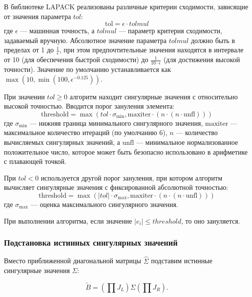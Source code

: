 В библиотеке LAPACK \cite{Anderson1999} реализованы различные критерии сходимости, зависящие от значения параметра \(tol\):
\begin{equation}
\text{tol} = \epsilon \cdot tolmul
\end{equation}
где \(\epsilon\) — машинная точность, а \(tolmul\) — параметр критерия сходимости, задаваемый вручную. Абсолютное значение параметра \(tolmul\) должно быть в пределах от 1 до \(\frac{1}{\epsilon}\), при этом предпочтительные значения находятся в интервале от 10 (для обеспечения быстрой сходимости) до \(\frac{1}{10 \cdot \epsilon}\) (для достижения высокой точности). Значение по умолчанию устанавливается как \(\max(10, \min(100, \epsilon^{-0.125}))\).

При значении \(tol \geq 0\) алгоритм находит сингулярные значения с относительно высокой точностью. Вводится порог зануления элемента:
\begin{equation}
\text{threshold} = \max(tol \cdot \sigma_{\text{min}}, \text{maxiter} \cdot (n \cdot (n \cdot \text{unfl})))
\end{equation}
где \(\sigma_{\text{min}}\) — нижняя граница минимального сингулярного значения, \(\text{maxiter}\) — максимальное количество итераций (по умолчанию 6), \(n\) — количество вычисляемых сингулярных значений, а \(\text{unfl}\) — минимальное нормализованное положительное число, которое может быть безопасно использовано в арифметике с плавающей точкой.

При \(tol < 0\) используется другой порог зануления, при котором алгоритм вычисляет сингулярные значения с фиксированной абсолютной точностью:
\begin{equation}
\text{threshold} = \max (|tol| \cdot \sigma_{\text{max}}, \text{maxiter} \cdot (n \cdot (n \cdot \text{unfl})))
\end{equation}
где \(\sigma_{\text{max}}\) — оценка максимального сингулярного значения.

При выполнении алгоритма, если значение \(|e_i| \le threshold\), то оно зануляется.

\subsubsection{Подстановка истинных сингулярных значений}

Вместо приближенной диагональной матрицы \( \widehat{\Sigma} \) подставим истинные сингулярные значения \( \Sigma \):

\begin{equation}
\tilde{B} = \left( \prod J_L \right) \Sigma \left( \prod J_R \right).
\end{equation}

